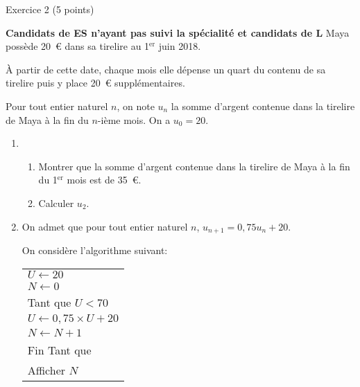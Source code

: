 
%
\begin{h2}Exercice 2 (5 points)\end{h2}
\textbf{Candidats de ES n'ayant pas suivi la spécialité et candidats de L}
\medskip
Maya possède 20~\euro{} dans sa tirelire au 1${^\text{er}}$ juin 2018.
\par
À partir de cette date, chaque mois elle dépense un quart du contenu de sa tirelire puis y place 20~\euro{} supplémentaires.
\par
Pour tout entier naturel $n$, on note $u_n$ la somme d'argent contenue dans la tirelire de Maya à la fin du $n$-ième mois. On a $u_0=20$.
\begin{enumerate}
     \item
     \begin{enumerate}[label=\alph*.]
          \item Montrer que la somme d'argent contenue dans la tirelire de Maya à la fin du 1${^\text{er}}$ mois est de 35~\euro.
          \item Calculer $u_2$.
     \end{enumerate}
     \item On admet que pour tout entier naturel $n$, $u_{n+1}=0,75 u_n + 20$.
     \par
     On considère l'algorithme suivant:
     \begin{center}
          \begin{extern}%
               \begin{tabularx}{0.5\linewidth}{|X|}
                    \hline
                    $U \longleftarrow 20$\\
                    $N \longleftarrow 0$\\
                    Tant que $U < 70$\\
                    \hspace*{1cm} $U \longleftarrow 0,75 \times U + 20$\\
                    \hspace*{1cm} $N \longleftarrow N+1$\\
                    Fin Tant que\\
                    Afficher $N$\\
                    \hline
               \end{tabularx}
          \end{extern}
     \end{center}

\end{enumerate}
